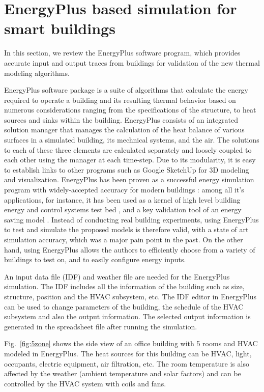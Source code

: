 \section{EnergyPlus based simulation for smart buildings}
\label{sec:energy_plus_review}
\textcolor{feb18rev}{In this section, we review the EnergyPlus software program, which provides
accurate input and output traces from buildings for validation of the new
thermal modeling algorithms.}

EnergyPlus software package is a suite of algorithms that calculate the
energy required to operate a building and its resulting thermal behavior based
on numerous considerations ranging from the specifications of the structure, to
heat sources and sinks within the building. EnergyPlus consists of
an integrated solution manager that manages the calculation of the heat balance
of various surfaces in a simulated building, its mechnical systems, and the air.
The solutions to each of these three elements
are calculated separately and loosely coupled to each other using the manager at
each time-step. Due to its modularity, it is easy to establish links to other
programs such as Google SketchUp for 3D modeling and visualization.
\textcolor{feb18rev}{EnergyPlus has been proven as a successful energy
simulation program with widely-accepted accuracy for modern buildings
\cite{yang2016review}: among all it's applications, for instance, it has been
used as a kernel of high level building energy and control systems test bed
\cite{wetter2011co}, and a key validation tool of an energy saving model
\cite{mardaljevic2009daylight}. Instead of conducting real building
experiments, using EnergyPlus to test and simulate the proposed models is
therefore valid, with a state of art simulation accuracy, which was a major
pain point in the past. On the other hand, using EnergyPlus allows the authors
to efficiently choose from a variety of buildings to test on, and to easily
configure energy inputs.}

An input data file (IDF) and weather file are needed for the EnergyPlus
simulation. The IDF includes all the information of the building such
as size, structure, position and the HVAC subsystem, etc. The IDF
editor in EnergyPlus can be used to change parameters of the building, the
schedule of the HVAC subsystem and also the output information. The
selected output information is generated in the spreadsheet file
after running the simulation.

Fig.~\ref{fig:5zone} shows the side view of an office building
with 5 rooms and HVAC modeled in EnergyPlus. The heat sources for this building
can be HVAC, light, occupants, electric equipment, air filtration, etc. The
room temperature is also affected by the weather (ambient temperature and solar
factors) and can be controlled by the HVAC system with coils
and fans.

